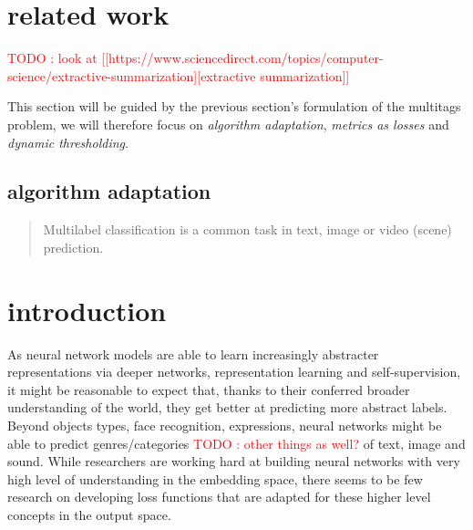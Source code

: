 \documentclass[sigconf,natbib,screen=true,review=true,anonymous]{acmart}
\newcommand\todo[1]{\textcolor{red}{TODO : #1}}
\begin{document}

\section{related work}
\label{sec:org451f9ac}

\todo{look at [[https://www.sciencedirect.com/topics/computer-science/extractive-summarization][extractive summarization]]}

This section will be guided by the previous section's formulation of the multitags problem, we will therefore focus on \emph{algorithm adaptation}, \emph{metrics as losses} and \emph{dynamic thresholding}.

\subsection{algorithm adaptation}
\label{sec:org7f9e7ad}

\begin{abstract}
Multilabel classification is a common task in text, image or video (scene) prediction.
\end{abstract}



\maketitle

\acresetall

\section{introduction}
\label{sec:orgd3d0def}

As neural network models are able to learn increasingly abstracter representations via deeper networks, representation learning and self-supervision, it might be reasonable to expect that, thanks to their conferred broader understanding of the world, they get better at predicting more abstract labels. Beyond objects types, face recognition, expressions, neural networks might be able to predict genres/categories \todo{other things as well?} of text, image and sound. While researchers are working hard at building neural networks with very high level of understanding in the embedding space, there seems to be few research on developing loss functions that are adapted for these higher level concepts in the output space.
\end{document}
